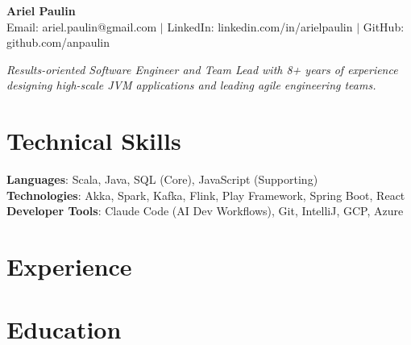 \documentclass[letterpaper,11pt]{article}
\newcommand{\resumeSubHeadingListStart}{\begin{itemize}[leftmargin=0.15in, label={}]}
\newcommand{\resumeSubHeadingListEnd}{\end{itemize}}
\begin{document}
\begin{center}
    \textbf{\Huge Ariel Paulin} \\ \vspace{4pt}
    \small{
    Email: ariel.paulin@gmail.com $|$ 
    LinkedIn: linkedin.com/in/arielpaulin $|$
    GitHub: github.com/anpaulin
    }
    \vspace{4pt}
\end{center}

\begin{center}
    \small\textit{Results-oriented Software Engineer and Team Lead with 8+ years of experience designing high-scale JVM applications and leading agile engineering teams.}
\end{center}

\section{Technical Skills}
\begin{itemize}[leftmargin=0.15in, label={}]
  \small{\item{
    \textbf{Languages}: Scala, Java, SQL (Core), JavaScript (Supporting) \\
    \textbf{Technologies}: Akka, Spark, Kafka, Flink, Play Framework, Spring Boot, React \\
    \textbf{Developer Tools}: Claude Code (AI Dev Workflows), Git, IntelliJ, GCP, Azure
  }}
\end{itemize}

\section{Experience}
  \resumeSubHeadingListStart
    
    
    
    
    
    
    
    
    
    
    
  \resumeSubHeadingListEnd

\section{Education}
  \resumeSubHeadingListStart
    
  \resumeSubHeadingListEnd
\end{document}
